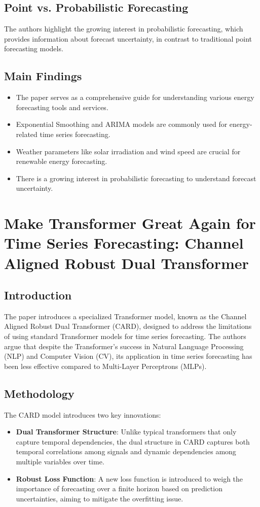 \documentclass{article}
\begin{document}
\subsection{Point vs. Probabilistic Forecasting}

The authors highlight the growing interest in probabilistic forecasting, which provides information about forecast uncertainty, in contrast to traditional point forecasting models.

\subsection{Main Findings}

\begin{itemize}
    \item The paper serves as a comprehensive guide for understanding various energy forecasting tools and services.
    \item Exponential Smoothing and ARIMA models are commonly used for energy-related time series forecasting.
    \item Weather parameters like solar irradiation and wind speed are crucial for renewable energy forecasting.
    \item There is a growing interest in probabilistic forecasting to understand forecast uncertainty.
\end{itemize}

\newpage
\section{Make Transformer Great Again for Time Series Forecasting: Channel Aligned Robust Dual Transformer}

\subsection{Introduction}
The paper introduces a specialized Transformer model, known as the Channel Aligned Robust Dual Transformer (CARD), designed to address the limitations of using standard Transformer models for time series forecasting. The authors argue that despite the Transformer's success in Natural Language Processing (NLP) and Computer Vision (CV), its application in time series forecasting has been less effective compared to Multi-Layer Perceptrons (MLPs).

\subsection{Methodology}
The CARD model introduces two key innovations:
\begin{itemize}
    \item \textbf{Dual Transformer Structure}: Unlike typical transformers that only capture temporal dependencies, the dual structure in CARD captures both temporal correlations among signals and dynamic dependencies among multiple variables over time.
    \item \textbf{Robust Loss Function}: A new loss function is introduced to weigh the importance of forecasting over a finite horizon based on prediction uncertainties, aiming to mitigate the overfitting issue.
\end{itemize}
\end{document}
